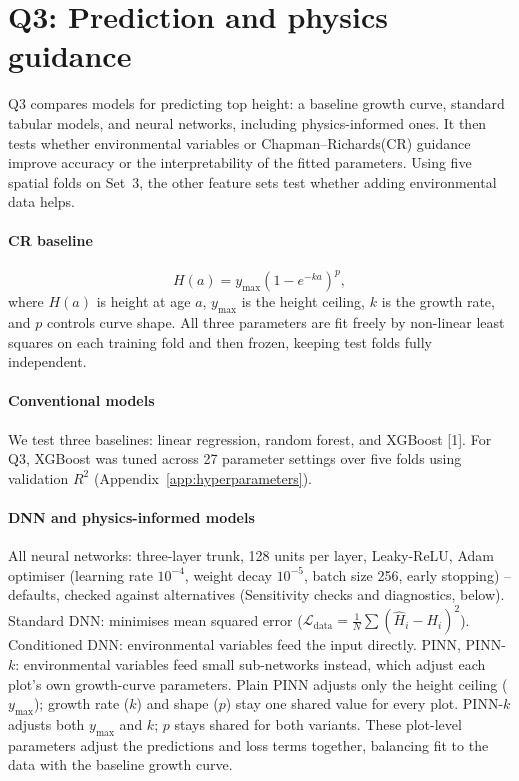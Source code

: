\documentclass[logo,msc,ai]{infthesis}           %
\begin{document}
\section{Q3: Prediction and physics guidance}
Q3 compares models for predicting top height: a baseline growth curve, standard tabular models, and neural networks, including physics-informed ones. It then tests whether environmental variables or Chapman--Richards(CR) guidance improve accuracy or the interpretability of the fitted parameters. Using five spatial folds on Set~3, the other feature sets test whether adding environmental data helps.

\paragraph*{CR baseline}
\begin{equation}
H(a) = y_{\max}\left(1 - e^{-ka}\right)^p,
\label{eq:cr}
\end{equation}
where $H(a)$ is height at age $a$, $y_{\max}$ is the height ceiling, $k$ is the growth rate, and $p$ controls curve shape. All three parameters are fit freely by non-linear least squares on each training fold and then frozen, keeping test folds fully independent.

\paragraph*{Conventional models}
We test three baselines: linear regression, random forest, and XGBoost [1]. For Q3, XGBoost was tuned across 27 parameter settings over five folds using validation $R^2$ (Appendix~\ref{app:hyperparameters}).

\paragraph*{DNN and physics-informed models}
All neural networks: three-layer trunk, 128 units per layer, Leaky-ReLU, Adam optimiser (learning rate $10^{-4}$, weight decay $10^{-5}$, batch size 256, early stopping) -- defaults, checked against alternatives (Sensitivity checks and diagnostics, below). Standard DNN: minimises mean squared error ($\mathcal{L}_{\mathrm{data}} = \frac{1}{N}\sum (\hat H_i-H_i)^2$). Conditioned DNN: environmental variables feed the input directly. PINN, PINN-$k$: environmental variables feed small sub-networks instead, which adjust each plot's own growth-curve parameters. Plain PINN adjusts only the height ceiling ($y_{\max}$); growth rate ($k$) and shape ($p$) stay one shared value for every plot. PINN-$k$ adjusts both $y_{\max}$ and $k$; $p$ stays shared for both variants. These plot-level parameters adjust the predictions and loss terms together, balancing fit to the data with the baseline growth curve.
\end{document}
